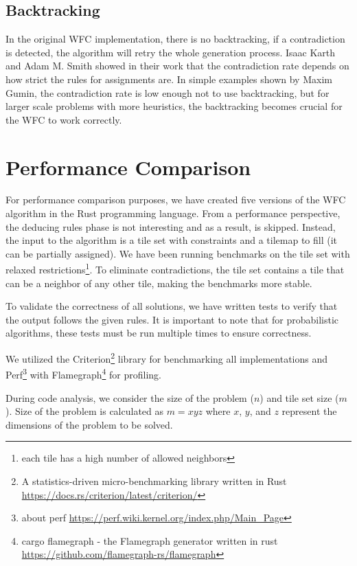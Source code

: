 \documentclass[shortabstract, english, inz]{iithesis}
\begin{document}
\section{Backtracking}
\label{backtracking}
In the original WFC implementation, there is no backtracking, if a contradiction is detected, the algorithm will retry the whole generation process. Isaac Karth and Adam M. Smith showed in their work that the contradiction rate depends on how strict the rules for assignments are. In simple examples shown by Maxim Gumin, the contradiction rate is low enough not to use backtracking, but for larger scale problems with more heuristics, the backtracking becomes crucial for the WFC to work correctly.
\cite{Smith}



\chapter{Performance Comparison}
\label{chapter4}
For performance comparison purposes, we have created five versions of the WFC algorithm in the Rust programming language. From a performance perspective, the deducing rules phase is not interesting and as a result, is skipped. Instead, the input to the algorithm is a tile set with constraints and a tilemap to fill (it can be partially assigned). We have been running benchmarks on the tile set with relaxed restrictions\footnote{each tile has a high number of allowed neighbors}. To eliminate contradictions, the tile set contains a tile that can be a neighbor of any other tile, making the benchmarks more stable.


To validate the correctness of all solutions, we have written tests to verify that the output follows the given rules. It is important to note that for probabilistic algorithms, these tests must be run multiple times to ensure correctness.


We utilized the Criterion\footnote{A statistics-driven micro-benchmarking library written in Rust \url{https://docs.rs/criterion/latest/criterion/}} library for benchmarking all implementations and Perf\footnote{about perf \url{https://perf.wiki.kernel.org/index.php/Main_Page}} with Flamegraph\footnote{cargo flamegraph - the Flamegraph generator written in rust \url{https://github.com/flamegraph-rs/flamegraph}} for profiling.

During code analysis, we consider the size of the problem (\( n \)) and tile set size (\( m \)). Size of the problem is calculated as \( m = xyz\) where \(x\), \(y\), and \(z\) represent the dimensions of the problem to be solved.
\end{document}
